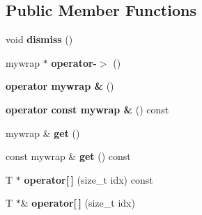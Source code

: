 \subsection*{Public Member Functions}
\begin{DoxyCompactItemize}
\item 
\hypertarget{struct_assimp_1_1_blender_1_1_temp_array_a875789aa43e6209328c5b30b152cc10b}{void {\bfseries dismiss} ()}\label{struct_assimp_1_1_blender_1_1_temp_array_a875789aa43e6209328c5b30b152cc10b}

\item 
\hypertarget{struct_assimp_1_1_blender_1_1_temp_array_a7868c448671f58b3db97dc33cf18a74f}{mywrap $\ast$ {\bfseries operator-\/$>$} ()}\label{struct_assimp_1_1_blender_1_1_temp_array_a7868c448671f58b3db97dc33cf18a74f}

\item 
\hypertarget{struct_assimp_1_1_blender_1_1_temp_array_a49db85a7caea2f819b0b81805869db7d}{{\bfseries operator mywrap \&} ()}\label{struct_assimp_1_1_blender_1_1_temp_array_a49db85a7caea2f819b0b81805869db7d}

\item 
\hypertarget{struct_assimp_1_1_blender_1_1_temp_array_a68a568b650846e6bec77b783c9f66529}{{\bfseries operator const mywrap \&} () const }\label{struct_assimp_1_1_blender_1_1_temp_array_a68a568b650846e6bec77b783c9f66529}

\item 
\hypertarget{struct_assimp_1_1_blender_1_1_temp_array_ab5016c403d92e5f934a031c515d1396e}{mywrap \& {\bfseries get} ()}\label{struct_assimp_1_1_blender_1_1_temp_array_ab5016c403d92e5f934a031c515d1396e}

\item 
\hypertarget{struct_assimp_1_1_blender_1_1_temp_array_a25f29905a070d4c7cc8816f9823fbc85}{const mywrap \& {\bfseries get} () const }\label{struct_assimp_1_1_blender_1_1_temp_array_a25f29905a070d4c7cc8816f9823fbc85}

\item 
\hypertarget{struct_assimp_1_1_blender_1_1_temp_array_a26e67bd87c26e0b9811c33b42b391fd9}{T $\ast$ {\bfseries operator\mbox{[}$\,$\mbox{]}} (size\+\_\+t idx) const }\label{struct_assimp_1_1_blender_1_1_temp_array_a26e67bd87c26e0b9811c33b42b391fd9}

\item 
\hypertarget{struct_assimp_1_1_blender_1_1_temp_array_a3868e400cf9d46283cdabf76df362e12}{T $\ast$\& {\bfseries operator\mbox{[}$\,$\mbox{]}} (size\+\_\+t idx)}\label{struct_assimp_1_1_blender_1_1_temp_array_a3868e400cf9d46283cdabf76df362e12}

\end{DoxyCompactItemize}


